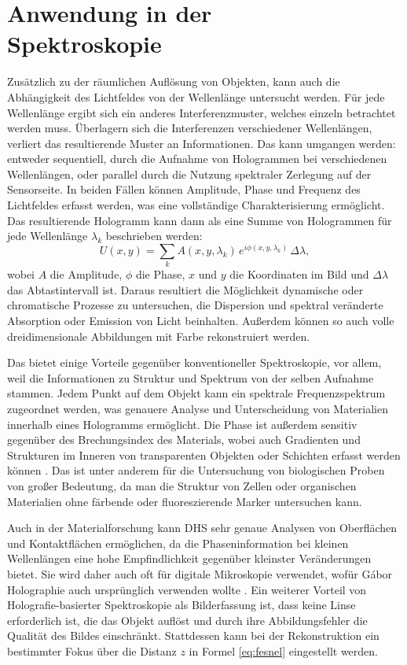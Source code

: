 \documentclass[10pt,twocolumn,a4paper]{article}
\begin{document}
\section{Anwendung in der \\Spektroskopie}
Zusätzlich zu der räumlichen Auflösung von Objekten, kann auch die Abhängigkeit des Lichtfeldes von der Wellenlänge untersucht werden. Für jede Wellenlänge ergibt sich ein anderes Interferenzmuster, welches einzeln betrachtet werden muss. Überlagern sich die Interferenzen verschiedener Wellenlängen, verliert das resultierende Muster an Informationen. Das kann umgangen werden: entweder sequentiell, durch die Aufnahme von Hologrammen bei verschiedenen Wellenlängen, oder parallel durch die Nutzung spektraler Zerlegung auf der Sensorseite. In beiden Fällen können Amplitude, Phase und Frequenz des Lichtfeldes erfasst werden, was eine vollständige Charakterisierung ermöglicht. Das resultierende Hologramm kann dann als eine Summe von Hologrammen für jede Wellenlänge $\lambda_k$ beschrieben werden:
\begin{equation}
    U(x, y) = \sum_k A(x, y, \lambda_k)\, e^{i \phi(x, y, \lambda_k)}\, \Delta\lambda,
\end{equation}
wobei $A$ die Amplitude, $\phi$ die Phase, $x$ und $y$ die Koordinaten im Bild und $\Delta\lambda$ das Abtastintervall ist.
Daraus resultiert die Möglichkeit dynamische oder chromatische Prozesse zu untersuchen, die Dispersion und spektral veränderte Absorption oder Emission von Licht beinhalten. Außerdem können so auch volle dreidimensionale Abbildungen mit Farbe rekonstruiert werden.

Das bietet einige Vorteile gegenüber konventioneller Spektroskopie, vor allem, weil die Informationen zu Struktur und Spektrum von der selben Aufnahme stammen. Jedem Punkt auf dem Objekt kann ein spektrale Frequenzspektrum zugeordnet werden, was genauere Analyse und Unterscheidung von Materialien innerhalb eines Hologramms ermöglicht. Die Phase ist außerdem sensitiv gegenüber des Brechungsindex des Materials, wobei auch Gradienten und Strukturen im Inneren von transparenten Objekten oder Schichten erfasst werden können \cite{industrial}. Das ist unter anderem für die Untersuchung von biologischen Proben von großer Bedeutung, da man die Struktur von Zellen oder organischen Materialien ohne färbende oder fluoreszierende Marker untersuchen kann. 

Auch in der Materialforschung kann DHS sehr genaue Analysen von Oberflächen und Kontaktflächen ermöglichen, da die Phaseninformation bei kleinen Wellenlängen eine hohe Empfindlichkeit gegenüber kleinster Veränderungen bietet. Sie wird daher auch oft für digitale Mikroskopie verwendet, wofür Gábor Holographie auch ursprünglich verwenden wollte \cite{DHM}. Ein weiterer Vorteil von Holografie-basierter Spektroskopie als Bilderfassung ist, dass keine Linse erforderlich ist, die das Objekt auflöst und durch ihre Abbildungsfehler die Qualität des Bildes einschränkt. Stattdessen kann bei der Rekonstruktion ein bestimmter Fokus über die Distanz $z$ in Formel \ref{eq:fesnel} eingestellt werden.
\end{document}
